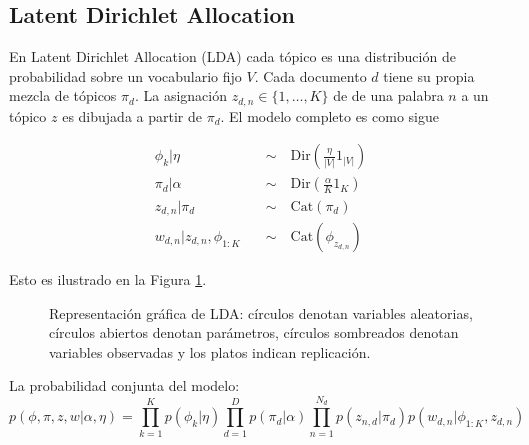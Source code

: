 \documentclass[letterpaper,12pt,oneside]{book} %
\begin{document}
\subsection{Latent Dirichlet Allocation}
\label{sec:lda}

En Latent Dirichlet Allocation (LDA) \citep{blei2003latent} cada tópico es una distribución de probabilidad sobre un vocabulario fijo $V$. Cada documento $d$ tiene su propia mezcla de tópicos $\pi_{d}$. La asignación $z_{d,n}\in\{1, \ldots, K\}$  de de una palabra $n$ a un tópico $z$ es dibujada a partir de $\pi_{d}$. El modelo completo es como sigue

\begin{align}
    \phi_{k}|\eta \quad & \sim\quad \text{Dir}(\frac{\eta}{|V|}1_{|V|})\\
    \pi_{d}|\alpha \quad & \sim \quad \text{Dir}(\frac{\alpha}{K}1_{K})\\
    z_{d,n}|\pi_{d} \quad & \sim \quad \text{Cat}(\pi_{d})\\
    w_{d,n}|z_{d,n}, \phi_{1:K} \quad & \sim \quad \text{Cat}(\phi_{z_{d,n}})
\end{align}

Esto es ilustrado en la Figura \ref{img:lda}.
\begin{figure}
  \centering
\caption{Representación gráfica de LDA: círculos denotan variables aleatorias, círculos abiertos denotan parámetros, círculos sombreados denotan variables observadas y los platos indican replicación.}
\label{img:lda}
\end{figure}

La probabilidad conjunta del modelo:
\begin{equation}
    p(\phi, \pi, z, w|\alpha, \eta)= \prod_{k=1}^{K}p(\phi_{k}|\eta)\prod_{d=1}^{D}p(\pi_{d}|\alpha)\prod_{n=1}^{N_{d}}p(z_{n,d}|\pi_{d})p(w_{d,n}|\phi_{1:K}, z_{d,n})
\end{equation}
\end{document}
